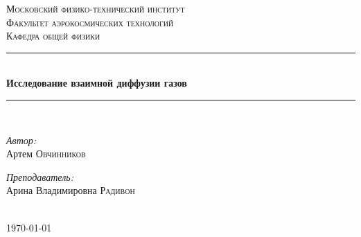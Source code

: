 \documentclass[1 pt]{article}
\begin{document}
\begin{titlepage}
\newcommand{\HRule}{\rule{\linewidth}{0.3 mm}} %

\center %
 

\textsc{\Large Московский физико-технический институт }\\[1.5cm] %
\textsc{\Large Факультет аэрокосмических технологий}\\[0.5cm] %
\textsc{\large Кафедра общей физики}\\[0.5cm] %


\HRule \\[0.4cm]
{ \huge \bfseries Исследование взаимной
диффузии газов }\\[0.4cm] %
\HRule \\[1.5cm]
 

\begin{minipage}{0.4\textwidth}
\begin{flushleft} \large
\emph{Автор:}\\ Артем \textsc{Овчинников} %
\end{flushleft}
\end{minipage}
\begin{minipage}{0.4\textwidth}
\begin{flushright} \large
\emph{Преподаватель:} \\
Арина Владимировна \textsc{Радивон} %
\end{flushright}
\end{minipage}\\[4cm]

{\large \today}\\[2cm] %


 

\vfill %

\end{titlepage}
\tableofcontents
\newpage
\end{document}
